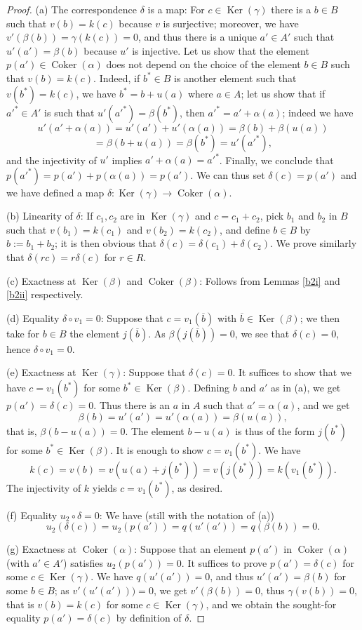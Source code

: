 \documentclass[parskip=half,fontsize=12pt]{scrartcl}%
\newcommand{\oo}{\operatorname}\newcommand{\ooo}{\operatorname*}
\begin{document}
\begin{proof} (a) The correspondence $\delta$ is a map: For $c\in\oo{Ker}(\gamma)$ there is a $b\in B$ such that $v(b)=k(c)$ because $v$ is surjective; moreover, we have $v'(\beta(b))=\gamma(k(c))=0$, and thus there is a unique $a'\in A'$ such that $u'(a')=\beta(b)$ because $u'$ is injective. Let us show that the element $p(a')\in\oo{Coker}(\alpha)$ does not depend on the choice of the element $b\in B$ such that $v(b)=k(c)$. Indeed, if $b^*\in B$ is another element such that $v(b^*)=k(c)$, we have $b^*=b+u(a)$ where $a\in A$; let us show that if $a'^*\in A'$ is such that $u'(a'^*)=\beta(b^*)$, then $a'^*=a'+\alpha(a)$; indeed we have 
$$
u'(a'+\alpha(a))=u'(a')+u'(\alpha(a))=\beta(b)+\beta(u(a))
$$ 
$$
=\beta(b+u(a))=\beta(b^*)=u'(a'^*),
$$ 
and the injectivity of $u'$ implies $a'+\alpha(a)=a'^*$. Finally, we conclude that $p(a'^*)=p(a')+p(\alpha(a))=p(a')$. We can thus set $\delta(c)=p(a')$ and we have defined a map $\delta:\oo{Ker}(\gamma)\to\oo{Coker}(\alpha)$.

(b) Linearity of $\delta$: If $c_1,c_2$ are in $\oo{Ker}(\gamma)$ and $c=c_1+c_2$, pick $b_1$ and $b_2$ in $B$ such that $v(b_1)=k(c_1)$ and $v(b_2)=k(c_2)$, and define $b\in B$ by $b:=b_1+b_2$; it is then obvious that $\delta(c)=\delta(c_1)+\delta(c_2)$. We prove similarly that $\delta(rc)=r\delta(c)$ for $r\in R$.

(c) Exactness at $\oo{Ker}(\beta)$ and $\oo{Coker}(\beta)$: Follows from Lemmas \ref{b2i} and \ref{b2ii} respectively.

(d) Equality $\delta\circ v_1=0$: Suppose that $c=v_1(\overline b)$ with $\overline b\in\oo{Ker}(\beta)$; we then take for $b\in B$ the element $j(\overline b)$. As $\beta(j(\overline b))=0$, we see that $\delta(c)=0$, hence $\delta\circ v_1=0$. 

(e) Exactness at $\oo{Ker}(\gamma)$: Suppose that $\delta(c)=0$. It suffices to show that we have $c=v_1(b^*)$ for some $b^*\in\oo{Ker}(\beta)$. Defining $b$ and $a'$ as in (a), we get $p(a')=\delta(c)=0$. Thus there is an $a$ in $A$ such that $a'=\alpha(a)$, %
and we get 
$$
\beta(b)=u'(a')= u'(\alpha(a))= \beta(u(a)),
$$ 
that is, $\beta(b-u(a))=0$. The element $b-u(a)$ is thus of the form $j(b^*)$ for some $b^*\in\oo{Ker}(\beta)$. It is enough to show $c=v_1(b^*)$. We have 
$$
k(c)=v(b)= v(u(a)+j(b^*))=v(j(b^*))=k(v_1(b^*)).
$$ 
The injectivity of $k$ yields $c=v_1(b^*)$, as desired.

(f) Equality $u_2\circ\delta=0$: We have (still with the notation of (a)) 
$$
u_2(\delta(c))=u_2(p(a'))=q(u'(a'))=q(\beta(b))=0.
$$ 

(g) Exactness at $\oo{Coker}(\alpha)$: Suppose that an element $p(a')$ in $\oo{Coker}(\alpha)$ (with $a'\in A'$) satisfies $u_2(p(a'))=0$. It suffices to prove $p(a')=\delta(c)$ for some $c\in\oo{Ker}(\gamma)$. We have $q(u'(a'))=0$, and thus $u'(a')=\beta(b)$ for some $b\in B$; as $v'(u'(a')))=0$, we get $v'(\beta(b))=0$, thus $\gamma(v(b))=0$, that is $v(b)=k(c)$ for some $c\in\oo{Ker}(\gamma)$, and we obtain the sought-for equality $p(a')=\delta(c)$ by definition of $\delta$.%
\end{proof}
\end{document}

